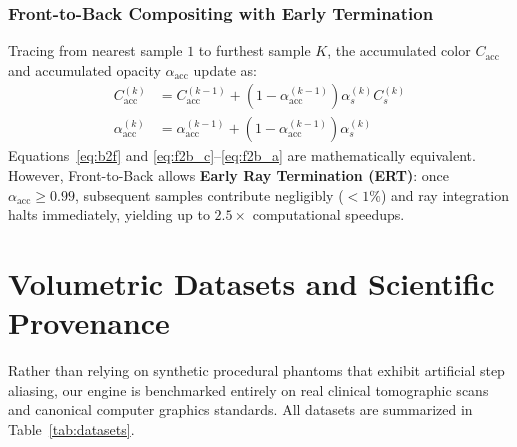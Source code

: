 \documentclass[10pt,twocolumn,a4paper]{article}
\begin{document}
\subsubsection{Front-to-Back Compositing with Early Termination}
Tracing from nearest sample $1$ to furthest sample $K$, the accumulated color $C_{\text{acc}}$ and accumulated opacity $\alpha_{\text{acc}}$ update as:
\begin{align}
C_{\text{acc}}^{(k)} &= C_{\text{acc}}^{(k-1)} + (1 - \alpha_{\text{acc}}^{(k-1)}) \alpha_s^{(k)} C_s^{(k)} \label{eq:f2b_c} \\
\alpha_{\text{acc}}^{(k)} &= \alpha_{\text{acc}}^{(k-1)} + (1 - \alpha_{\text{acc}}^{(k-1)}) \alpha_s^{(k)} \label{eq:f2b_a}
\end{align}
Equations~\eqref{eq:b2f} and \eqref{eq:f2b_c}--\eqref{eq:f2b_a} are mathematically equivalent. However, Front-to-Back allows \textbf{Early Ray Termination (ERT)}: once $\alpha_{\text{acc}} \ge 0.99$, subsequent samples contribute negligibly ($<1\%$) and ray integration halts immediately, yielding up to $2.5\times$ computational speedups.

\section{Volumetric Datasets and Scientific Provenance}

Rather than relying on synthetic procedural phantoms that exhibit artificial step aliasing, our engine is benchmarked entirely on real clinical tomographic scans and canonical computer graphics standards. All datasets are summarized in Table~\ref{tab:datasets}.
\end{document}

